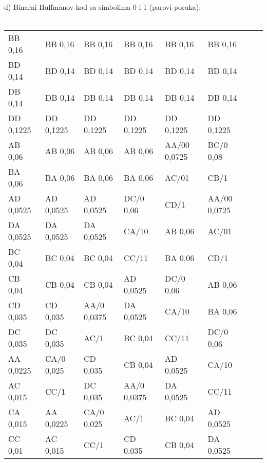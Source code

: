\documentclass[12pt]{article}
\begin{document}
\begin{enumerate}
d) Binarni Huffmanov kod sa simbolima 0 i 1 (parovi poruka):
\\
\\
\begin{tabular}{|l|l|l|l|l|l|ll}
\cline{1-6}
BB 0,16   & BB 0,16    & BB 0,16     & BB 0,16     & BB 0,16      & BB 0,16      &  &  \\ \cline{1-6}
BD 0,14   & BD 0,14    & BD 0,14     & BD 0,14     & BD 0,14      & BD 0,14      &  &  \\ \cline{1-6}
DB 0,14   & DB 0,14    & DB 0,14     & DB 0,14     & DB 0,14      & DB 0,14      &  &  \\ \cline{1-6}
DD 0,1225 & DD 0,1225  & DD 0,1225   & DD 0,1225   & DD 0,1225    & DD 0,1225    &  &  \\ \cline{1-6}
AB 0,06   & AB 0,06    & AB 0,06     & AB 0,06     & AA/00 0,0725 & BC/0 0,08    &  &  \\ \cline{1-4}
BA 0,06   & BA 0,06    & BA 0,06     & BA 0,06     & AC/01        & CB/1         &  &  \\ \cline{1-4} \cline{6-6}
AD 0,0525 & AD 0,0525  & AD 0,0525   & DC/0 0,06   & CD/1         & AA/00 0,0725 &  &  \\ \cline{1-3} \cline{5-5}
DA 0,0525 & DA 0,0525  & DA 0,0525   & CA/10       & AB 0,06      & AC/01        &  &  \\ \cline{1-3} \cline{5-5}
BC 0,04   & BC 0,04    & BC 0,04     & CC/11       & BA 0,06      & CD/1         &  &  \\ \cline{1-6}
CB 0,04   & CB 0,04    & CB 0,04     & AD 0,0525   & DC/0 0,06    & AB 0,06      &  &  \\ \cline{1-4} \cline{6-6}
CD 0,035  & CD 0,035   & AA/0 0,0375 & DA 0,0525   & CA/10        & BA 0,06      &  &  \\ \cline{1-2} \cline{4-4} \cline{6-6}
DC 0,035  & DC 0,035   & AC/1        & BC 0,04     & CC/11        & DC/0 0,06    &  &  \\ \cline{1-5}
AA 0,0225 & CA/0 0,025 & CD 0,035    & CB 0,04     & AD 0,0525    & CA/10        &  &  \\ \cline{1-1} \cline{3-5}
AC 0,015  & CC/1       & DC 0,035    & AA/0 0,0375 & DA 0,0525    & CC/11        &  &  \\ \cline{1-3} \cline{5-6}
CA 0,015  & AA 0,0225  & CA/0 0,025  & AC/1        & BC 0,04      & AD 0,0525    &  &  \\ \cline{1-2} \cline{4-6}
CC 0,01   & AC 0,015   & CC/1        & CD 0,035    & CB 0,04      & DA 0,0525    &  &  \\ \cline{1-6}

\end{tabular}
\end{enumerate}
\end{document}
